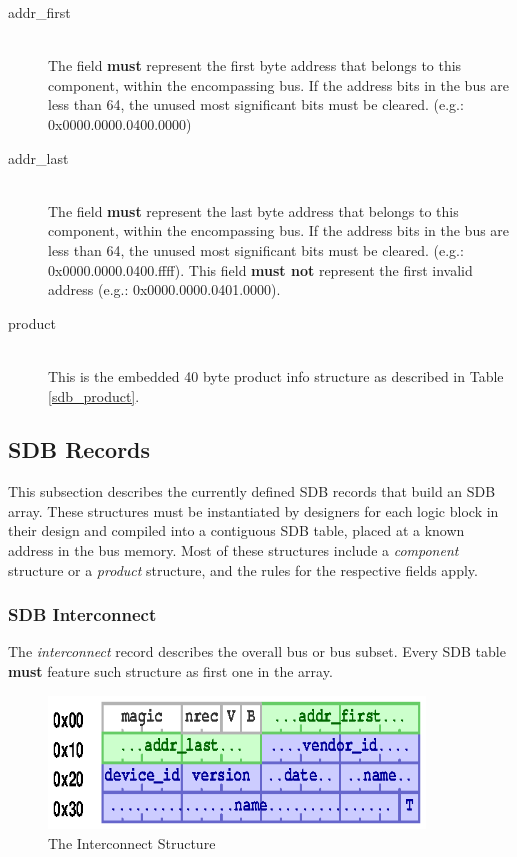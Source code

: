 \documentclass[a4paper, 12pt]{article}
\begin{document}
\begin{description}
\item[addr\_first] \hfill \\
The field \textbf{must} represent the first byte address that belongs to this component,
within the encompassing bus. If the address bits in the bus are less than 64, the
unused most significant bits must be cleared. (e.g.: 0x0000.0000.0400.0000)

\item[addr\_last] \hfill \\
The field \textbf{must} represent the last byte address that belongs to this component,
within the encompassing bus. If the address bits in the bus are less than 64, the
unused most significant bits must be cleared. (e.g.: 0x0000.0000.0400.ffff).
This field \textbf{must not} represent the first invalid address (e.g.: 0x0000.0000.0401.0000).

\item[product] \hfill \\
This is the embedded 40 byte product info structure as described in Table \ref{sdb_product}.
\end{description}

\subsection{SDB Records}

This subsection describes the currently defined SDB records that build an SDB array.
These
structures must be instantiated by designers for each logic block in their design and compiled into
a contiguous SDB table, placed at a known address in the bus memory.  Most of these structures
include a \textit{component} structure or a \textit{product} structure, and the rules for the
respective fields apply.

\pagebreak 

\subsubsection{SDB Interconnect}

The \textit{interconnect} record describes the overall bus or bus subset. Every
SDB table \textbf{must} feature such structure as first one in the array.

\begin{figure}[h]
\centering%
\includegraphics[width=100mm]{img/sdb-interconnect.ps}
\caption{The Interconnect Structure}
\label{fig:FigureInterconnect}
\end{figure}
\end{document}
